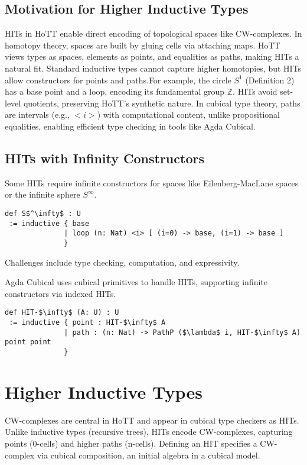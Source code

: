 \documentclass{article}
\theoremstyle{definition}
\begin{document}
\subsection{Motivation for Higher Inductive Types}
HITs in HoTT enable direct encoding of topological spaces like
CW-complexes. In homotopy theory, spaces are built by gluing
cells via attaching maps. HoTT views types as spaces, elements
as points, and equalities as paths, making HITs a natural fit.
Standard inductive types cannot capture higher homotopies, but
HITs allow constructors for points and paths.For example, the circle \( S^1 \) (Definition 2) has a base
point and a loop, encoding its fundamental group
\( \mathbb{Z} \). HITs avoid set-level quotients, preserving
HoTT’s synthetic nature. In cubical type theory, paths are
intervals (e.g., \( <i> \)) with computational content, unlike
propositional equalities, enabling efficient type checking in
tools like Agda Cubical.

\subsection{HITs with Infinity Constructors}
Some HITs require infinite constructors for spaces like Eilenberg-MacLane spaces or the infinite sphere $S^\infty$.
\begin{lstlisting}[mathescape=true]
def S$^\infty$ : U
 := inductive { base
              | loop (n: Nat) <i> [ (i=0) -> base, (i=1) -> base ]
              }
\end{lstlisting}
Challenges include type checking, computation, and expressivity.

Agda Cubical uses cubical primitives to handle HITs, supporting
infinite constructors via indexed HITs.

\begin{lstlisting}[mathescape=true]
def HIT-$\infty$ (A: U) : U
 := inductive { point : HIT-$\infty$ A
              | path : (n: Nat) -> PathP ($\lambda$ i, HIT-$\infty$ A) point point
              }
\end{lstlisting}

\section{Higher Inductive Types}
CW-complexes are central in HoTT and appear in cubical type checkers as HITs.
Unlike inductive types (recursive trees), HITs encode CW-complexes, capturing
points (0-cells) and higher paths (n-cells). Defining an HIT specifies a CW-complex
via cubical composition, an initial algebra in a cubical model.
\end{document}
